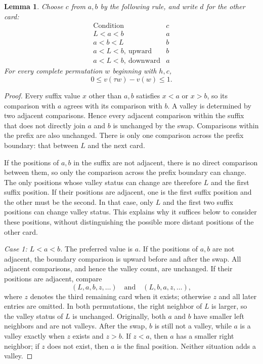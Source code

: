 \documentclass[11pt,reqno]{amsart}
\numberwithin{equation}{section}
\newtheorem{lemma}[theorem]{Lemma}
\theoremstyle{definition}
\theoremstyle{remark}
\begin{document}
\begin{lemma}\label{lem:swap}
Choose $c$ from $a,b$ by the following rule, and write $d$ for the other card:
\[
\begin{array}{c|c}
\text{Condition}&c\\\hline
L<a<b&a\\
a<b<L&b\\
a<L<b,\ \text{upward}&b\\
a<L<b,\ \text{downward}&a
\end{array}
\]
For every complete permutation $w$ beginning with $h,c$,
\begin{equation}\label{eq:swap}
 0\le v(\tau w)-v(w)\le1.
\end{equation}
\end{lemma}
\begin{proof}
Every suffix value $x$ other than $a,b$ satisfies $x<a$ or $x>b$, so its comparison with $a$ agrees with its comparison with $b$. A valley is determined by two adjacent comparisons. Hence every adjacent comparison within the suffix that does not directly join $a$ and $b$ is unchanged by the swap. Comparisons within the prefix are also unchanged. There is only one comparison across the prefix boundary: that between $L$ and the next card.

If the positions of $a,b$ in the suffix are not adjacent, there is no direct comparison between them, so only the comparison across the prefix boundary can change. The only positions whose valley status can change are therefore $L$ and the first suffix position. If their positions are adjacent, one is the first suffix position and the other must be the second. In that case, only $L$ and the first two suffix positions can change valley status. This explains why it suffices below to consider these positions, without distinguishing the possible more distant positions of the other card.

\emph{Case 1: $L<a<b$.}
The preferred value is $a$. If the positions of $a,b$ are not adjacent, the boundary comparison is upward before and after the swap. All adjacent comparisons, and hence the valley count, are unchanged. If their positions are adjacent, compare
\[
 (L,a,b,z,\ldots)\quad\text{and}\quad(L,b,a,z,\ldots),
\]
where $z$ denotes the third remaining card when it exists; otherwise $z$ and all later entries are omitted. In both permutations, the right neighbor of $L$ is larger, so the valley status of $L$ is unchanged. Originally, both $a$ and $b$ have smaller left neighbors and are not valleys. After the swap, $b$ is still not a valley, while $a$ is a valley exactly when $z$ exists and $z>b$. If $z<a$, then $a$ has a smaller right neighbor; if $z$ does not exist, then $a$ is the final position. Neither situation adds a valley.


\end{proof}
\end{document}
